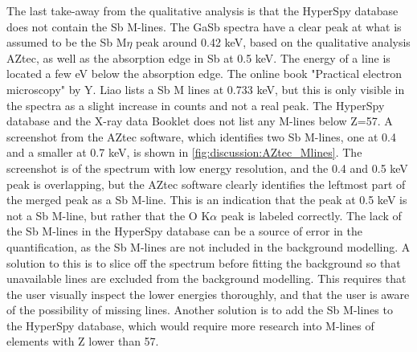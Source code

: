 The last take-away from the qualitative analysis is that the HyperSpy database does not contain the Sb M-lines.
The GaSb spectra have a clear peak at what is assumed to be the Sb M$\eta$ peak around 0.42 keV, based on the qualitative analysis AZtec, as well as the absorption edge in Sb at 0.5 keV.
The energy of a line is located a few eV below the absorption edge.
The online book "Practical electron microscopy" by Y. Liao \cite{liao2006practical} lists a Sb M lines at 0.733 keV, but this is only visible in the spectra as a slight increase in counts and not a real peak.
The HyperSpy database and the X-ray data Booklet \cite{thompson_x-ray_2004} does not list any M-lines below Z=57.
A screenshot from the AZtec software, which identifies two Sb M-lines, one at 0.4 and a smaller at 0.7 keV, is shown in \cref{fig:discussion:AZtec_Mlines}.
The screenshot is of the spectrum with low energy resolution, and the 0.4 and 0.5 keV peak is overlapping, but the AZtec software clearly identifies the leftmost part of the merged peak as a Sb M-line.
This is an indication that the peak at 0.5 keV is not a Sb M-line, but rather that the O K$\alpha$ peak is labeled correctly.
The lack of the Sb M-lines in the HyperSpy database can be a source of error in the quantification, as the Sb M-lines are not included in the background modelling.
A solution to this is to slice off the spectrum before fitting the background so that unavailable lines are excluded from the background modelling.
This requires that the user visually inspect the lower energies thoroughly, and that the user is aware of the possibility of missing lines.
Another solution is to add the Sb M-lines to the HyperSpy database, which would require more research into M-lines of elements with Z lower than 57.

